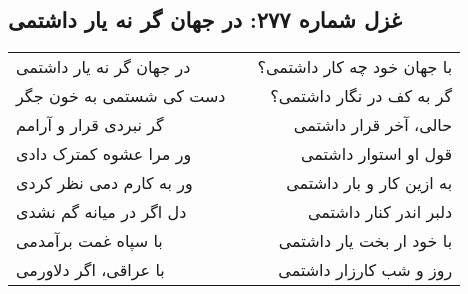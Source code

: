 \begin{center}
\section*{غزل شماره ۲۷۷: در جهان گر نه یار داشتمی}
\label{sec:277}
\begin{longtable}{l p{0.5cm} r}
در جهان گر نه یار داشتمی
&&
با جهان خود چه کار داشتمی؟
\\
دست کی شستمی به خون جگر
&&
گر به کف در نگار داشتمی؟
\\
گر نبردی قرار و آرامم
&&
حالی، آخر قرار داشتمی
\\
ور مرا عشوه کمترک دادی
&&
قول او استوار داشتمی
\\
ور به کارم دمی نظر کردی
&&
به ازین کار و بار داشتمی
\\
دل اگر در میانه گم نشدی
&&
دلبر اندر کنار داشتمی
\\
با سپاه غمت برآمدمی
&&
با خود ار بخت یار داشتمی
\\
با عراقی، اگر دلاورمی
&&
روز و شب کارزار داشتمی
\\
\end{longtable}
\end{center}
